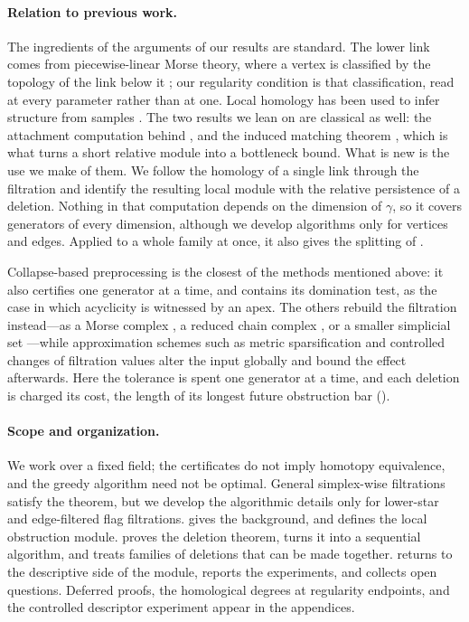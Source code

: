 \documentclass[11pt,letterpaper]{article}
\theoremstyle{definition}
\begin{document}
\paragraph{Relation to previous work.}
The ingredients of the arguments of our results are standard. The lower link comes from
piecewise-linear Morse theory, where a vertex is classified by the topology of
the link below it \cite{Banchoff1970,EdelsbrunnerHarer2010}; our regularity
condition is that classification, read at every parameter rather than at one.
Local homology has been used to infer structure from samples
\cite{BendichWangMukherjee2012,SkrabaWang2014}. The two results we lean on are
classical as well: the attachment computation behind ,
and the induced matching theorem \cite{BauerLesnick2015}, which is what turns a
short relative module into a bottleneck bound. What is new is the use we make
of them. We follow the homology of a single link through the filtration and
identify the resulting local module with the relative persistence of a
deletion. Nothing in that computation depends on the dimension of $\gamma$, so
it covers generators of every dimension, although we develop algorithms only
for vertices and edges. Applied to a whole family at once, it also gives the
splitting of .


Collapse-based preprocessing is the closest of the methods mentioned above: it
also certifies one generator at a time, and  contains its
domination test, as the case in which acyclicity is witnessed by an apex. The
others rebuild the filtration instead---as a Morse complex
\cite{MischaikowNanda2013}, a reduced chain complex \cite{DlotkoWagner2014}, or
a smaller simplicial set \cite{Zomorodian2010}---while approximation schemes
such as metric sparsification \cite{Sheehy2013} and controlled changes of
filtration values \cite{NigmetovMorozov2024} alter the input globally and bound
the effect afterwards. Here the tolerance is spent one generator at a time, and
each deletion is charged its cost, the length of its longest future obstruction
bar ().


\paragraph{Scope and organization.}
We work over a fixed field; the certificates do not imply homotopy equivalence,
and the greedy algorithm need not be optimal. General simplex-wise filtrations
satisfy the theorem, but we develop the algorithmic details only for lower-star
and edge-filtered flag filtrations.  gives the
background, and  defines the local obstruction module.
 proves the deletion theorem,  turns
it into a sequential algorithm, and  treats families of
deletions that can be made together.  returns to the
descriptive side of the module,  reports the
experiments, and  collects open questions. Deferred
proofs, the homological degrees at regularity endpoints, and the controlled
descriptor experiment appear in the appendices.
\end{document}
